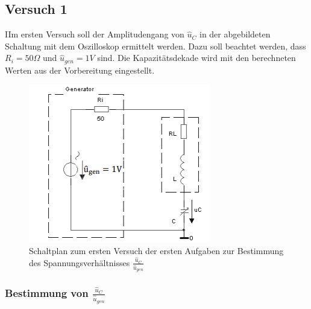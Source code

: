 \documentclass{article}
\begin{document}
\subsection{Versuch 1}
\begin{task}
  IIm ersten Versuch soll der Amplitudengang von $\hat{u}_C$ in der abgebildeten Schaltung mit dem Oszilloskop ermittelt werden. Dazu soll beachtet werden,
  dass $R_i = 50\Omega$ und $\hat{u}_{gen} = 1V$ sind. Die Kapazitätsdekade wird mit den berechneten Werten aus der Vorbereitung eingestellt.
\end{task}


\begin{figure}[h!]
  \begin{center}
    \includegraphics{../assets/images/ETP3/Versuch1Schaltplan.PNG}
    \caption{Schaltplan zum ersten Versuch der ersten Aufgaben zur Bestimmung des Spannungsverhältnisses $\frac{\hat{u}_C}{\hat{u}_{gen}}$}
  \end{center}
\end{figure}

\newpage

\subsubsection{Bestimmung von $\frac{\hat{u}_C}{\hat{u}_{gen}}$}
\end{document}
